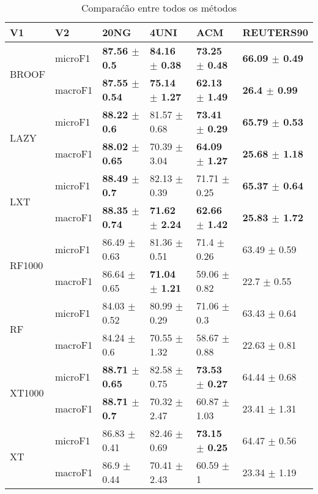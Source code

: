 \documentclass[]{article}
\begin{document}
\begin{table}[ht]
\centering
\begin{tabular}{llllll}
  \hline
V1 & V2 & 20NG & 4UNI & ACM & REUTERS90 \\ 
  \hline
\multirow{2}{*}{BROOF} & microF1 & \bf{87.56 $\pm$  0.5} & \bf{84.16 $\pm$  0.38} & \bf{73.25 $\pm$  0.48} & \bf{66.09 $\pm$  0.49} \\ 
   & macroF1 & \bf{87.55 $\pm$  0.54} & \bf{75.14 $\pm$  1.27} & \bf{62.13 $\pm$  1.49} & \bf{26.4 $\pm$  0.99} \\ 
  \multirow{2}{*}{LAZY} & microF1 & \bf{88.22 $\pm$  0.6} & 81.57 $\pm$  0.68 & \bf{73.41 $\pm$  0.29} & \bf{65.79 $\pm$  0.53} \\ 
   & macroF1 & \bf{88.02 $\pm$  0.65} & 70.39 $\pm$  3.04 & \bf{64.09 $\pm$  1.27} & \bf{25.68 $\pm$  1.18} \\ 
  \multirow{2}{*}{LXT} & microF1 & \bf{88.49 $\pm$  0.7} & 82.13 $\pm$  0.39 & 71.71 $\pm$  0.25 & \bf{65.37 $\pm$  0.64} \\ 
   & macroF1 & \bf{88.35 $\pm$  0.74} & \bf{71.62 $\pm$  2.24} & \bf{62.66 $\pm$  1.42} & \bf{25.83 $\pm$  1.72} \\ 
  \multirow{2}{*}{RF1000} & microF1 & 86.49 $\pm$  0.63 & 81.36 $\pm$  0.51 & 71.4 $\pm$  0.26 & 63.49 $\pm$  0.59 \\ 
   & macroF1 & 86.64 $\pm$  0.65 & \bf{71.04 $\pm$  1.21} & 59.06 $\pm$  0.82 & 22.7 $\pm$  0.55 \\ 
  \multirow{2}{*}{RF} & microF1 & 84.03 $\pm$  0.52 & 80.99 $\pm$  0.29 & 71.06 $\pm$  0.3 & 63.43 $\pm$  0.64 \\ 
   & macroF1 & 84.24 $\pm$  0.6 & 70.55 $\pm$  1.32 & 58.67 $\pm$  0.88 & 22.63 $\pm$  0.81 \\ 
  \multirow{2}{*}{XT1000} & microF1 & \bf{88.71 $\pm$  0.65} & 82.58 $\pm$  0.75 & \bf{73.53 $\pm$  0.27} & 64.44 $\pm$  0.68 \\ 
   & macroF1 & \bf{88.71 $\pm$  0.7} & 70.32 $\pm$  2.47 & 60.87 $\pm$  1.03 & 23.41 $\pm$  1.31 \\ 
  \multirow{2}{*}{XT} & microF1 & 86.83 $\pm$  0.41 & 82.46 $\pm$  0.69 & \bf{73.15 $\pm$  0.25} & 64.47 $\pm$  0.56 \\ 
   & macroF1 & 86.9 $\pm$  0.44 & 70.41 $\pm$  2.43 & 60.59 $\pm$  1 & 23.34 $\pm$  1.19 \\ 
   \hline
\end{tabular}
\caption{Comparaćão entre todos os métodos} 
\end{table}
\end{document}
